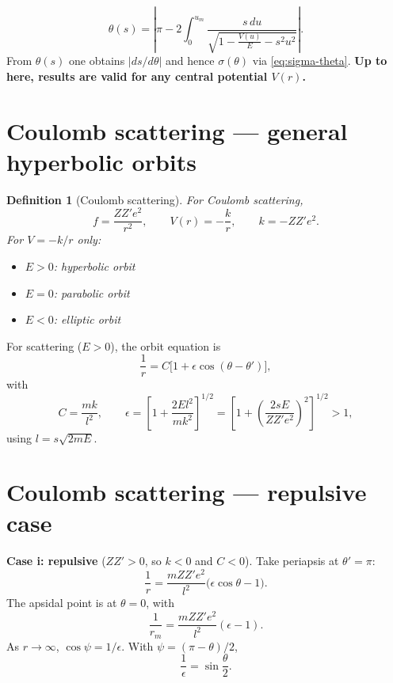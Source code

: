 \documentclass[11pt]{article}
\newtheorem{definition}{Definition}
\begin{document}
\begin{equation}
  \theta(s) = \left|\pi - 2\int_0^{u_m} \frac{s\,du}{\sqrt{1 - \frac{V(u)}{E} - s^2 u^2}}\right|.
  \label{eq:theta-universal}
\end{equation}
From $\theta(s)$ one obtains $|ds/d\theta|$ and hence $\sigma(\theta)$ via \eqref{eq:sigma-theta}.
\textbf{Up to here, results are valid for any central potential $V(r)$.}

\section{Coulomb scattering --- general hyperbolic orbits}

\begin{definition}[Coulomb scattering]
For Coulomb scattering,
\begin{equation}
  f = \frac{ZZ'e^2}{r^2}, \qquad V(r) = -\frac{k}{r}, \qquad k = -ZZ'e^2.
\end{equation}
For $V = -k/r$ only:
\begin{itemize}
  \item $E > 0$: hyperbolic orbit
  \item $E = 0$: parabolic orbit
  \item $E < 0$: elliptic orbit
\end{itemize}
\end{definition}

For scattering ($E > 0$), the orbit equation is
\begin{equation}
  \frac{1}{r} = C\bigl[1 + \epsilon\cos(\theta - \theta')\bigr],
\end{equation}
with
\begin{equation}
  C = \frac{mk}{l^2}, \qquad
  \epsilon = \left[1 + \frac{2El^2}{mk^2}\right]^{1/2}
  = \left[1 + \left(\frac{2sE}{ZZ'e^2}\right)^2\right]^{1/2} > 1,
\end{equation}
using $l = s\sqrt{2mE}$.

\section{Coulomb scattering --- repulsive case}

\textbf{Case i: repulsive} ($ZZ' > 0$, so $k < 0$ and $C < 0$). Take periapsis at $\theta' = \pi$:
\begin{equation}
  \frac{1}{r} = \frac{mZZ'e^2}{l^2}\bigl(\epsilon\cos\theta - 1\bigr).
\end{equation}
The apsidal point is at $\theta = 0$, with
\begin{equation}
  \frac{1}{r_m} = \frac{mZZ'e^2}{l^2}(\epsilon - 1).
\end{equation}
As $r \to \infty$, $\cos\psi = 1/\epsilon$. With $\psi = (\pi - \theta)/2$,
\begin{equation}
  \frac{1}{\epsilon} = \sin\frac{\theta}{2}.
\end{equation}
\end{document}
